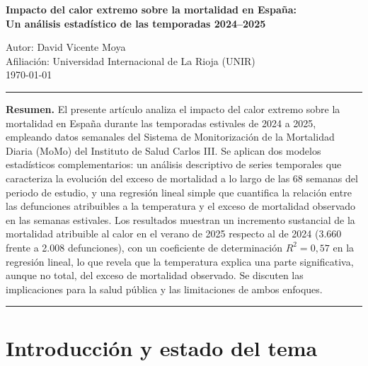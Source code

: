 \documentclass[11pt, a4paper]{article}
\begin{document}
\begin{center}
  {\LARGE\bfseries Impacto del calor extremo sobre la mortalidad en España:\\
  Un análisis estadístico de las temporadas 2024--2025}

  \vspace{0.8em}
  {\large Autor: David Vicente Moya}\\[0.3em]
  {\normalsize Afiliación: Universidad Internacional de La Rioja (UNIR)}\\[0.3em]
  {\normalsize \today}
\end{center}

\vspace{0.5em}
\hrule
\vspace{0.8em}

\noindent\textbf{Resumen.}\quad
El presente artículo analiza el impacto del calor extremo sobre la mortalidad
en España durante las temporadas estivales de 2024 a 2025, empleando datos
semanales del Sistema de Monitorización de la Mortalidad Diaria (MoMo) del
Instituto de Salud Carlos III. Se aplican dos modelos estadísticos
complementarios: un análisis descriptivo de series temporales que caracteriza
la evolución del exceso de mortalidad a lo largo de las 68 semanas del periodo
de estudio, y una regresión lineal simple que cuantifica la relación entre las
defunciones atribuibles a la temperatura y el exceso de mortalidad observado
en las semanas estivales. Los resultados muestran un incremento sustancial de
la mortalidad atribuible al calor en el verano de 2025 respecto al de 2024
(3.660 frente a 2.008 defunciones), con un coeficiente de determinación
$R^2 = 0{,}57$ en la regresión lineal, lo que revela que la temperatura
explica una parte significativa, aunque no total, del exceso de mortalidad
observado. Se discuten las implicaciones para la salud pública y las
limitaciones de ambos enfoques.

\vspace{0.8em}
\hrule
\vspace{1em}

\section{Introducción y estado del tema}
\end{document}
